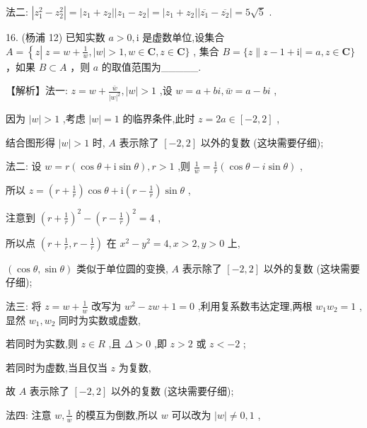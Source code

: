 \documentclass[10pt]{article}
\begin{document}
法二: \(\left| {{z}_{1}^{2} - {z}_{2}^{2}}\right|  = \left| {{z}_{1} + {z}_{2}}\right| \left| {{z}_{1} - {z}_{2}}\right|  = \left| {{z}_{1} + {z}_{2}}\right| \left| {\overline{{z}_{1}} - \overline{{z}_{2}}}\right|  = 5\sqrt{5}\) .

16. (杨浦 12) 已知实数 \(a > 0,\mathrm{i}\) 是虚数单位,设集合 \(A = \left\{  {z\left| {\;z = w + \frac{1}{w}}\right. ,\left| w\right|  > 1}\right. ,w \in  \mathbf{C},z \in  \mathbf{C}\}\) , 集合 \(B = \{ z\parallel z - 1 + \mathrm{i} \mid   = a,z \in  \mathbf{C}\}\) ，如果 \(B \subset  A\) ，则 \(a\) 的取值范围为\_\_\_\_\_.

【解析】法一: \(z = w + \frac{\bar{w}}{{\left| w\right| }^{2}},\left| w\right|  > 1\) ,设 \(w = a + {bi},\bar{w} = a - {bi}\) ,

因为 \(\left| w\right|  > 1\) ,考虑 \(\left| w\right|  = 1\) 的临界条件,此时 \(z = {2a} \in  \left\lbrack  {-2,2}\right\rbrack\) ,

结合图形得 \(\left| w\right|  > 1\) 时, \(A\) 表示除了 \(\left\lbrack  {-2,2}\right\rbrack\) 以外的复数 (这块需要仔细);

法二: 设 \(w = r\left( {\cos \theta  + \mathrm{i}\sin \theta }\right) ,r > 1\) ,则 \(\frac{1}{w} = \frac{1}{r}\left( {\cos \theta  - i\sin \theta }\right)\) ,

所以 \(z = \left( {r + \frac{1}{r}}\right) \cos \theta  + \mathrm{i}\left( {r - \frac{1}{r}}\right) \sin \theta\) ,

注意到 \({\left( r + \frac{1}{r}\right) }^{2} - {\left( r - \frac{1}{r}\right) }^{2} = 4\) ,

所以点 \(\left( {r + \frac{1}{r},r - \frac{1}{r}}\right)\) 在 \({x}^{2} - {y}^{2} = 4,x > 2,y > 0\) 上,

\(\left( {\cos \theta ,\sin \theta }\right)\) 类似于单位圆的变换, \(A\) 表示除了 \(\left\lbrack  {-2,2}\right\rbrack\) 以外的复数 (这块需要仔细);

法三: 将 \(z = w + \frac{1}{w}\) 改写为 \({w}^{2} - {zw} + 1 = 0\) ,利用复系数韦达定理,两根 \({w}_{1}{w}_{2} = 1\) , 显然 \({w}_{1},{w}_{2}\) 同时为实数或虚数,

若同时为实数,则 \(z \in  R\) ,且 \(\Delta  > 0\) ,即 \(z > 2\) 或 \(z <  - 2\) ;

若同时为虚数,当且仅当 \(z\) 为复数,

故 \(A\) 表示除了 \(\left\lbrack  {-2,2}\right\rbrack\) 以外的复数 (这块需要仔细);

法四: 注意 \(w,\frac{1}{w}\) 的模互为倒数,所以 \(w\) 可以改为 \(\left| w\right|  \neq  0,1\) ,
\end{document}
